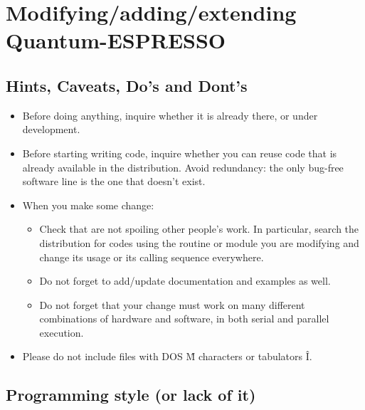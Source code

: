 \documentclass[12pt,a4paper]{article}
\begin{document}
\section{ Modifying/adding/extending Quantum-ESPRESSO}
\subsection{Hints, Caveats, Do's and Dont's}

\begin{itemize}
\item Before doing anything, inquire whether it is already there, or under development.
\item Before starting writing code, inquire whether you can reuse code that is already available in the distribution. Avoid redundancy: the only bug-free software line is the one that doesn't exist.
\item When you make some change:
\begin{itemize}
\item Check that are not spoiling other people's work. In particular, search the distribution for codes using the routine or module you are modifying and change its usage or its calling sequence everywhere.
\item Do not forget to add/update documentation and examples as well.
\item Do not forget that your change must work on many different combinations of hardware and software, in both serial and parallel execution.
\end{itemize}
\item Please do not include files with DOS \^M characters or 
tabulators \^I.
\end{itemize}

\subsection{Programming style (or lack of it)}
\end{document}
